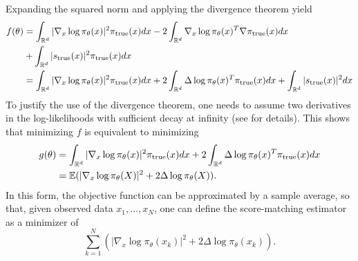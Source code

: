 Expanding the squared norm and applying the divergence theorem yield
\begin{align*}
f(\theta) &=  \int_{{\mathbb{R}}^d} |\nabla_x \log \pi_\theta(x)|^2\pi_{\mathrm{true}}(x) dx  - 2\int_{{\mathbb{R}}^d} \nabla_x \log \pi_\theta(x)^T \nabla \pi_{\mathrm{true}}(x) dx \\
&+ \int_{{\mathbb{R}}^d} | s_{\mathrm{true}}(x)|^2 \pi_{\mathrm{true}}(x) dx\\
 &=  \int_{{\mathbb{R}}^d} |\nabla_x \log \pi_\theta(x)|^2\pi_{\mathrm{true}}(x)dx  + 2\int_{{\mathbb{R}}^d} \Delta \log \pi_\theta(x)^T  \pi_{\mathrm{true}}(x) dx + \int_{{\mathbb{R}}^d} | s_{\mathrm{true}}(x)|^2 dx
 \end{align*}
 To justify the use of the divergence theorem, one needs to assume two derivatives in the log-likelihoods with sufficient decay at infinity (see \citet{hyvarinen2005estimation} for details).  
 This shows that minimizing $f$ is equivalent to minimizing 
 \begin{align*}
 g(\theta) &= \int_{{\mathbb{R}}^d} |\nabla_x \log \pi_\theta(x)|^2\pi_{\mathrm{true}}(x)dx  + 2\int_{{\mathbb{R}}^d} \Delta \log \pi_\theta(x)^T  \pi_{\mathrm{true}}(x) dx\\
 & = \bm{\mathbb E}(|\nabla_x \log \pi_\theta(X)|^2  + 2\Delta \log \pi_\theta(X)).
 \end{align*}
 In this form, the objective function can be approximated by a sample average, so that, given observed data $x_1, \ldots, x_N$, one can define the score-matching estimator as a minimizer of 
 \begin{equation}
 \label{eq:scorematch.obj}
 \sum_{k=1}^N \left(|\nabla_x \log \pi_\theta(x_k)|^2  + 2\Delta \log \pi_\theta(x_k)\right).
 \end{equation}
 
